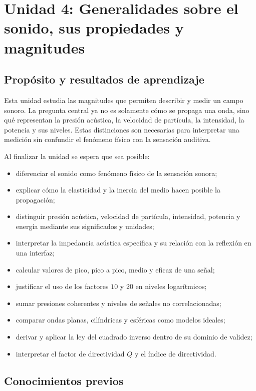\chapter{Unidad 4: Generalidades sobre el sonido, sus propiedades y magnitudes}
\label{chap:unidad-4}

\section{Propósito y resultados de aprendizaje}
\label{sec:u4-proposito}

Esta unidad estudia las magnitudes que permiten describir y medir un campo
sonoro. La pregunta central ya no es solamente cómo se propaga una onda, sino
qué representan la presión acústica, la velocidad de partícula, la intensidad,
la potencia y sus niveles. Estas distinciones son necesarias para interpretar
una medición sin confundir el fenómeno físico con la sensación auditiva.

Al finalizar la unidad se espera que sea posible:

\begin{itemize}
    \item diferenciar el sonido como fenómeno físico de la sensación sonora;
    \item explicar cómo la elasticidad y la inercia del medio hacen posible la
    propagación;
    \item distinguir presión acústica, velocidad de partícula, intensidad,
    potencia y energía mediante sus significados y unidades;
    \item interpretar la impedancia acústica específica y su relación con la
    reflexión en una interfaz;
    \item calcular valores de pico, pico a pico, medio y eficaz de una señal;
    \item justificar el uso de los factores \(10\) y \(20\) en niveles
    logarítmicos;
    \item sumar presiones coherentes y niveles de señales no correlacionadas;
    \item comparar ondas planas, cilíndricas y esféricas como modelos ideales;
    \item derivar y aplicar la ley del cuadrado inverso dentro de su dominio de
    validez;
    \item interpretar el factor de directividad \(Q\) y el índice de
    directividad.
\end{itemize}

\section{Conocimientos previos}
\label{sec:u4-previos}

